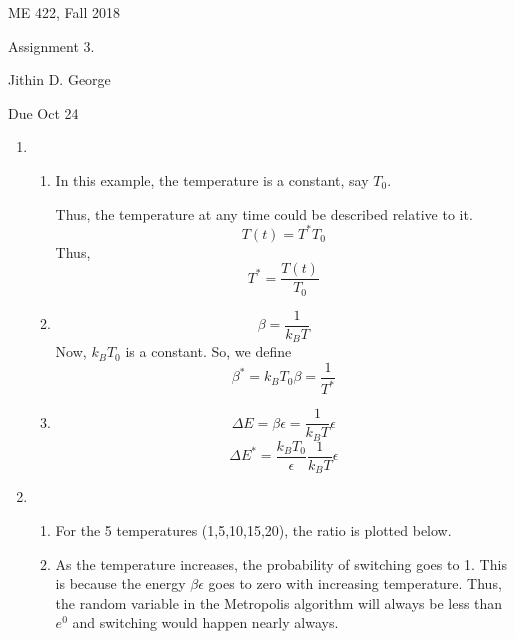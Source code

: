 \documentclass[letterpaper,12pt]{article}
\begin{document}




\noindent
{\scriptsize ME 422, Fall 2018} \hfill

\begin{center}
\large
Assignment 3.
\normalsize

Jithin D. George
\end{center}

\noindent
Due Oct 24
\vspace{.3in}




\noindent


\begin{enumerate}
\item



\begin{enumerate}
\item
In this example, the temperature is a constant, say $T_0$.

Thus, the temperature at any time could be described relative to it.
\[T(t) = T^* T_0\]
Thus,
\[T^* = \frac{T(t)}{T_0}\]

\item

\[\beta = \frac{1}{k_B T}\]
Now, $k_B T_0$ is a constant. So, we define
\[\beta^* = k_B T_0 \beta = \frac{1}{T^*}\]

\item 
\[\Delta E = \beta \epsilon =\frac{1}{k_B T} \epsilon \]
\[\Delta E^*  = \frac{k_B T_0}{\epsilon} \frac{1}{k_B T} \epsilon \]



\end{enumerate}


\item

\begin{enumerate}
\item
For the 5 temperatures (1,5,10,15,20), the ratio is plotted below.

\item 
As the temperature increases, the probability of switching goes to 1. This is because the energy $\beta \epsilon$ goes to zero with increasing temperature. Thus, the random variable in the Metropolis algorithm will always be less than $e^0$ and switching would happen nearly always.


\end{enumerate}
\end{enumerate}
\end{document}
